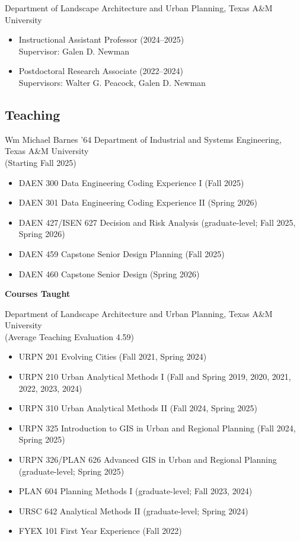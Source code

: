 \documentclass[11pt,oneside]{article}
\begin{document}
\vspace{1pt}

{Department of Landscape Architecture and Urban Planning, Texas A\&M University}\\
\begin{itemize}[leftmargin=20pt]
\item Instructional Assistant Professor (2024--2025)\\
      Supervisor: Galen D. Newman
\item Postdoctoral Research Associate (2022--2024)\\
      Supervisors: Walter G. Peacock, Galen D. Newman
\end{itemize}

\subsection*{Teaching}

{Wm Michael Barnes ’64 Department of Industrial and Systems Engineering, Texas A\&M University}\\
{(Starting Fall 2025)}
\vspace{1pt}
\begin{itemize}[leftmargin=20pt]
\item DAEN 300 Data Engineering Coding Experience I (Fall 2025)
\item DAEN 301 Data Engineering Coding Experience II (Spring 2026)
\item DAEN 427/ISEN 627 Decision and Risk Analysis (graduate-level; Fall 2025, Spring 2026)
\item DAEN 459 Capstone Senior Design Planning (Fall 2025)
\item DAEN 460 Capstone Senior Design (Spring 2026)
\end{itemize}

\vspace{1pt}

\textbf{Courses Taught}

\vspace{1pt}

{Department of Landscape Architecture and Urban Planning, Texas A\&M University}\\
({Average Teaching Evaluation 4.59})
\begin{itemize}[leftmargin=20pt]
\item URPN 201 Evolving Cities (Fall 2021, Spring 2024)
\item URPN 210 Urban Analytical Methods I (Fall and Spring 2019, 2020, 2021, 2022, 2023, 2024)
\item URPN 310 Urban Analytical Methods II (Fall 2024, Spring 2025)
\item URPN 325 Introduction to GIS in Urban and Regional Planning (Fall 2024, Spring 2025)
\item URPN 326/PLAN 626 Advanced GIS in Urban and Regional Planning (graduate-level; Spring 2025)
\item PLAN 604 Planning Methods I (graduate-level; Fall 2023, 2024)
\item URSC 642 Analytical Methods II (graduate-level; Spring 2024)
\item FYEX 101 First Year Experience (Fall 2022)
\end{itemize}
\end{document}
